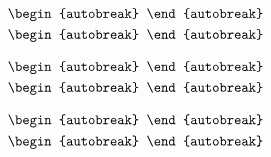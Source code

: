 \documentclass{article}
\begin{document}
\begin{align}
  \begin{autobreak}
    
  \end{autobreak}
  \\
  \begin{autobreak}
    
  \end{autobreak}
\end{align}

\begin{align}
  \begin{autobreak}
    
  \end{autobreak}
  \\
  \begin{autobreak}
    
  \end{autobreak}
\end{align}

\begin{align}
  \begin{autobreak}
    
  \end{autobreak}
  \\
  \begin{autobreak}
    
  \end{autobreak}
\end{align}
\end{document}
